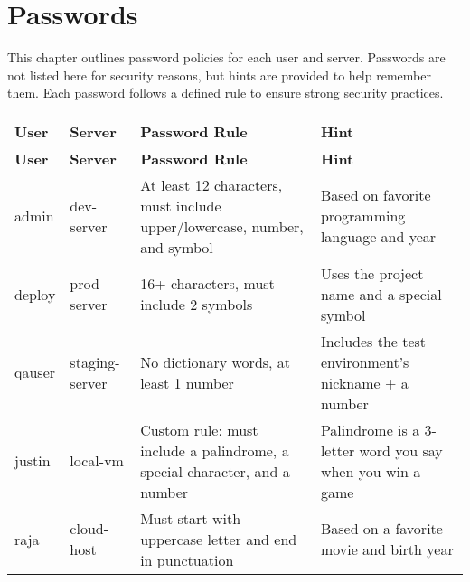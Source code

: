 \chapter{Passwords}
\label{ch:passwords}

This chapter outlines password policies for each user and server. Passwords are not listed here for security reasons, but hints are provided to help remember them. Each password follows a defined rule to ensure strong security practices.

\begin{longtable}
{|p{3cm}|p{3cm}|p{3.5cm}|p{5cm}|}
\hline
\textbf{User} & \textbf{Server} & \textbf{Password Rule} & \textbf{Hint} \\
\hline
\endfirsthead

\hline
\textbf{User} & \textbf{Server} & \textbf{Password Rule} & \textbf{Hint} \\
\hline
\endhead

admin & dev-server & At least 12 characters, must include upper/lowercase, number, and symbol & Based on favorite programming language and year \\
deploy & prod-server & 16+ characters, must include 2 symbols & Uses the project name and a special symbol \\
qauser & staging-server & No dictionary words, at least 1 number & Includes the test environment's nickname + a number \\
justin & local-vm & Custom rule: must include a palindrome, a special character, and a number & Palindrome is a 3-letter word you say when you win a game \\
raja & cloud-host & Must start with uppercase letter and end in punctuation & Based on a favorite movie and birth year \\
\hline
\end{longtable}
